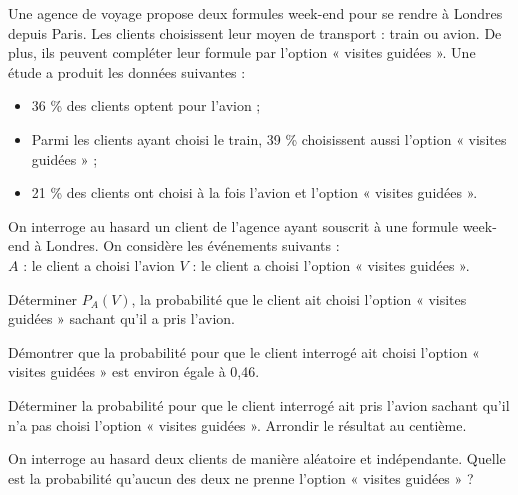 \documentclass[11pt]{article}
\begin{document}
\newpage
\begin{exercice}
Une agence de voyage propose deux formules week-end pour se rendre à Londres depuis Paris. Les clients choisissent leur moyen de transport : train ou avion. De plus, ils peuvent compléter leur formule par l'option « visites guidées ». Une étude a produit les données suivantes :
\begin{itemize}
    \item 36 \% des clients optent pour l'avion ;
    \item Parmi les clients ayant choisi le train, 39 \% choisissent aussi l'option « visites guidées » ;
    \item 21 \% des clients ont choisi à la fois l'avion et l'option « visites guidées ».
\end{itemize}

On interroge au hasard un client de l'agence ayant souscrit à une
formule week-end à Londres. On considère les événements suivants : \\
\(A\) : le client a choisi l'avion \hfill \(V\) : le client a choisi l'option « visites guidées ».

\begin{enu}
\item Déterminer \(P_A(V)\), la probabilité que le client ait choisi l'option « visites guidées » sachant qu'il a pris l'avion.
\item Démontrer que la probabilité pour que le client interrogé ait choisi l'option « visites guidées » est environ égale à 0,46.
\item Déterminer la probabilité pour que le client interrogé ait pris l'avion sachant qu'il n'a pas choisi l'option « visites guidées ». Arrondir le résultat au centième.
\item On interroge au hasard deux clients de manière aléatoire et indépendante. Quelle est la probabilité qu'aucun des deux ne prenne l'option « visites guidées » ?
\end{enu}
\end{exercice}
\end{document}
